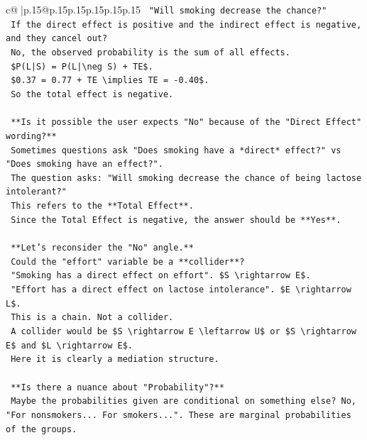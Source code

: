 \documentclass{article}
\begin{document}
{\begin{supertabular}{c@{$\;$}|p{.15\linewidth}@{}p{.15\linewidth}p{.15\linewidth}p{.15\linewidth}p{.15\linewidth}p{.15\linewidth}}
{{{\texttt{    "Will smoking decrease the chance?"} \\
\texttt{    If the direct effect is positive and the indirect effect is negative, and they cancel out?} \\
\texttt{    No, the observed probability is the sum of all effects.} \\
\texttt{    \$P(L|S) = P(L|\textbackslash{}neg S) + TE\$.} \\
\texttt{    \$0.37 = 0.77 + TE \textbackslash{}implies TE = {-}0.40\$.} \\
\texttt{    So the total effect is negative.} \\
\\ 
\texttt{    **Is it possible the user expects "No" because of the "Direct Effect" wording?**} \\
\texttt{    Sometimes questions ask "Does smoking have a *direct* effect?" vs "Does smoking have an effect?".} \\
\texttt{    The question asks: "Will smoking decrease the chance of being lactose intolerant?"} \\
\texttt{    This refers to the **Total Effect**.} \\
\texttt{    Since the Total Effect is negative, the answer should be **Yes**.} \\
\\ 
\texttt{    **Let's reconsider the "No" angle.**} \\
\texttt{    Could the "effort" variable be a **collider**?} \\
\texttt{    "Smoking has a direct effect on effort". \$S \textbackslash{}rightarrow E\$.} \\
\texttt{    "Effort has a direct effect on lactose intolerance". \$E \textbackslash{}rightarrow L\$.} \\
\texttt{    This is a chain. Not a collider.} \\
\texttt{    A collider would be \$S \textbackslash{}rightarrow E \textbackslash{}leftarrow U\$ or \$S \textbackslash{}rightarrow E\$ and \$L \textbackslash{}rightarrow E\$.} \\
\texttt{    Here it is clearly a mediation structure.} \\
\\ 
\texttt{    **Is there a nuance about "Probability"?**} \\
\texttt{    Maybe the probabilities given are conditional on something else? No, "For nonsmokers... For smokers...". These are marginal probabilities of the groups.} \\
}}}
\end{supertabular}}
\end{document}

